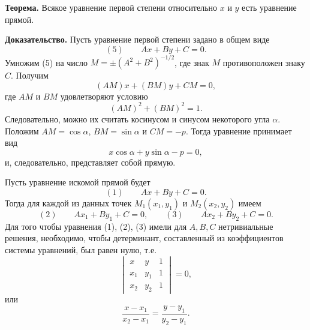 \begin{rusblock}
\textbf{Теорема.} Всякое уравнение первой степени относительно $x$ и $y$ есть уравнение прямой.

\textbf{Доказательство.} Пусть уравнение первой степени задано в общем виде
\[(5)\qquad Ax+By+C=0.
\]
Умножим (5) на число $M=\pm(A^2+B^2)^{-1/2}$, где знак $M$ противоположен знаку $C$. Получим
\[
(AM)x+(BM)y+CM=0,
\]
где $AM$ и $BM$ удовлетворяют условию
\[
(AM)^2+(BM)^2=1.
\]
Следовательно, можно их считать косинусом и синусом некоторого угла $\alpha$. Положим $AM=\cos\alpha$, $BM=\sin\alpha$ и $CM=-p$. Тогда уравнение принимает вид
\[
x\cos\alpha+y\sin\alpha-p=0,
\]
и, следовательно, представляет собой прямую.
\end{rusblock}

\begin{rusblock}
Пусть уравнение искомой прямой будет
\[(1)\qquad Ax+By+C=0.
\]
Тогда для каждой из данных точек $M_1(x_1,y_1)$ и $M_2(x_2,y_2)$ имеем
\[(2)\qquad Ax_1+By_1+C=0,\qquad (3)\qquad Ax_2+By_2+C=0.
\]
Для того чтобы уравнения (1), (2), (3) имели для $A,B,C$ нетривиальные решения, необходимо, чтобы детерминант, составленный из коэффициентов системы уравнений, был равен нулю, т.е.
\[
\begin{vmatrix}
x&y&1\\
x_1&y_1&1\\
x_2&y_2&1
\end{vmatrix}=0,
\]
или
\[
\frac{x-x_1}{x_2-x_1}=\frac{y-y_1}{y_2-y_1}.
\]
\end{rusblock}

